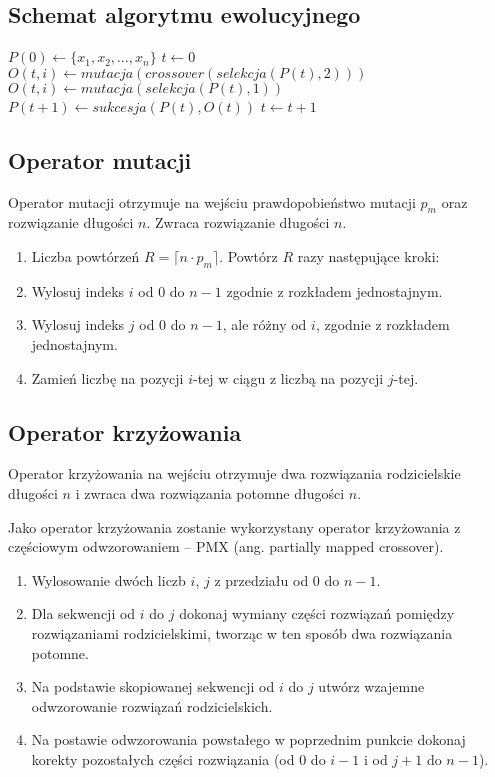 \documentclass[12pt, a4paper]{article}
\begin{document}
\subsection{Schemat algorytmu ewolucyjnego}

\begin{algorithm}[!htb]
\label{ea}
\begin{algorithmic}[1]
	\State $P(0) \gets \{x_1, x_2, \ldots, x_n\}$
	\State $t \gets 0$
    			\State $O(t,i) \gets mutacja(crossover(selekcja(P(t), 2)))$
    		\Else
    			\State $O(t,i) \gets mutacja(selekcja(P(t),1))$
    		\EndIf
    	\EndFor
    \State $P(t+1) \gets sukcesja(P(t),O(t))$
    \State $t \gets t+1$
  	\EndWhile
\EndFunction
\end{algorithmic}
\end{algorithm}

\subsection{Operator mutacji}

Operator mutacji otrzymuje na wejściu prawdopobieństwo mutacji $p_m$ oraz rozwiązanie długości $n$.
Zwraca rozwiązanie długości $n$.

\begin{enumerate}
 \item Liczba powtórzeń $R = \lceil n \cdot  p_m \rceil$. Powtórz $R$ razy następujące kroki:
 \item Wylosuj indeks $i$ od 0 do $n-1$ zgodnie z rozkładem jednostajnym.
 \item Wylosuj indeks $j$ od 0 do $n-1$, ale różny od $i$, zgodnie z rozkładem jednostajnym.
 \item Zamień liczbę na pozycji $i$-tej w ciągu z liczbą na pozycji $j$-tej.
\end{enumerate}

\subsection{Operator krzyżowania}

Operator krzyżowania na wejściu otrzymuje dwa rozwiązania rodzicielskie długości $n$ i zwraca dwa rozwiązania potomne długości $n$. 

Jako operator krzyżowania zostanie wykorzystany operator krzyżowania z częściowym odwzorowaniem -- {PMX} (ang. partially mapped crossover).
\begin{enumerate}
 \item Wylosowanie dwóch liczb $i$, $j$ z przedziału od $0$ do $n-1$.
 \item Dla sekwencji od $i$ do $j$ dokonaj wymiany części rozwiązań pomiędzy rozwiązaniami rodzicielskimi, tworząc w ten sposób dwa rozwiązania potomne.
 \item Na podstawie skopiowanej sekwencji od $i$ do $j$ utwórz wzajemne odwzorowanie rozwiązań rodzicielskich.
 \item Na postawie odwzorowania powstałego w poprzednim punkcie dokonaj korekty pozostałych części rozwiązania (od $0$ do $i-1$ i od $j+1$ do $n-1$).
\end{enumerate}
\end{document}
